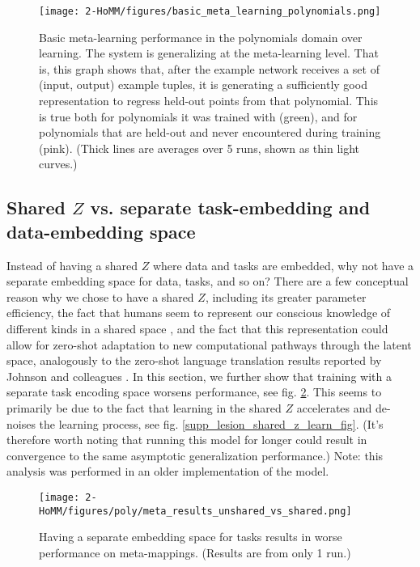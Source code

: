 \begin{figure}[H]
\centering
\texttt{[image: 2-HoMM/figures/basic\_meta\_learning\_polynomials.png]}
\caption[Basic meta-learning performance in the polynomials domain over learning.]{Basic meta-learning performance in the polynomials domain over learning. The system is generalizing at the meta-learning level. That is, this graph shows that, after the example network receives a set of (input, output) example tuples, it is generating a sufficiently good representation to regress held-out points from that polynomial. This is true both for polynomials it was trained with (green), and for polynomials that are held-out and never encountered during training (pink). (Thick lines are averages over 5 runs, shown as thin light curves.)} \label{supp_fig:HoMM:polynomials_basic_meta_learning}
\end{figure}

\subsection{Shared $Z$ vs. separate task-embedding and data-embedding space} \label{app_lesion_results_shared_z}
Instead of having a shared $Z$ where data and tasks are embedded, why not have a separate embedding space for data, tasks, and so on? There are a few conceptual reason why we chose to have a shared $Z$, including its greater parameter efficiency, the fact that humans seem to represent our conscious knowledge of different kinds in a shared space \citep[][]{Baars2005}, and the fact that this representation could allow for zero-shot adaptation to new computational pathways through the latent space, analogously to the zero-shot language translation results reported by Johnson and colleagues \citep{Johnson2016a}. In this section, we further show that training with a separate task encoding space worsens performance, see fig. \ref{supp_lesion_shared_z_fig}. This seems to primarily be due to the fact that learning in the shared $Z$ accelerates and de-noises the learning process, see fig. \ref{supp_lesion_shared_z_learn_fig}. (It's therefore worth noting that running this model for longer could result in convergence to the same asymptotic generalization performance.) Note: this analysis was performed in an older implementation of the model. \par
\begin{figure}[H]
\centering
\texttt{[image: 2-HoMM/figures/poly/meta\_results\_unshared\_vs\_shared.png]}
\caption[Having a separate embedding space for tasks results in worse performance on meta-mappings.]{Having a separate embedding space for tasks results in worse performance on meta-mappings. (Results are from only 1 run.)}
\label{supp_lesion_shared_z_fig}
\end{figure}

